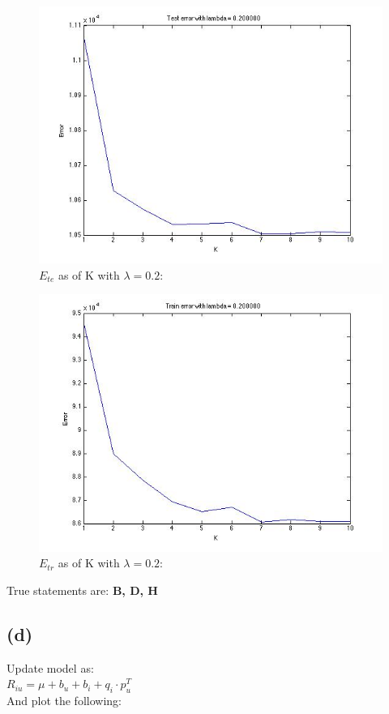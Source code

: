 \documentclass{article}
\begin{document}
\begin{figure}[H]
\centering
\includegraphics[scale=0.5]{TestErrorLambda02.jpg}
\caption{ $E_{te}$ as of K with $\lambda=0.2$:}
\label{}
\end{figure}

\begin{figure}[H]
\centering
\includegraphics[scale=0.5]{TrainErrorLambda02.jpg}
\caption{ $E_{tr}$ as of K with $\lambda=0.2$:}
\label{}
\end{figure}

True statements are: \textbf{B, D, H}


\subsection{(d)}
Update model as:\\
$R_{iu} = \mu + b_u + b_i + q_i\cdot p_u^T$ \\
And plot the following:\\
\end{document}
